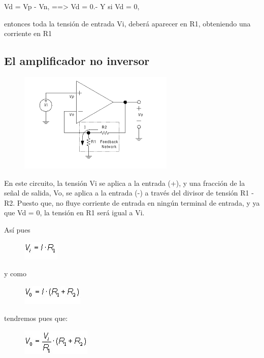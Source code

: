 \documentclass[10pt,letterpaper]{article}
\begin{document}
Vd = Vp - Vn, ==> Vd = 0.- Y si Vd = 0,

entonces toda la tensión de entrada Vi, deberá aparecer en R1, obteniendo una corriente en R1
 \newpage
\subsection*{El amplificador no inversor}
\begin{figure}[h!]
\centering
\includegraphics[scale=1]{descarga}
\end{figure}
En este circuito, la tensión Vi se aplica a la entrada (+), y una fracción de la señal de salida, Vo, se aplica a la entrada (-) a través del divisor de tensión R1 - R2. Puesto que, no fluye corriente de entrada en ningún terminal de entrada, y ya que Vd = 0, la tensión en R1 será igual a Vi. 

Así pues

 \begin{figure}[h!]
\centering
\includegraphics[scale=.9]{formula1}
\end{figure}

y como

\begin{figure}[h!]
\centering
\includegraphics[scale=1]{formula2}
\end{figure}

tendremos pues que:

\begin{figure}[h!]
\centering
\includegraphics[scale=1]{formula3}
\end{figure}
\end{document}
